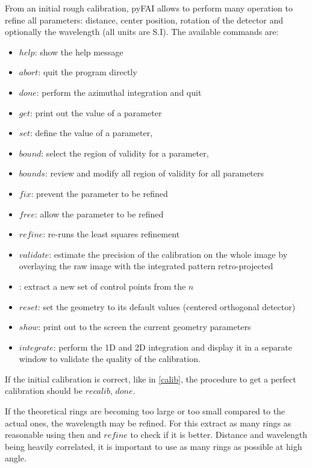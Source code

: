 \documentclass[preprint]{iucr}
\begin{document}
From an initial rough calibration, pyFAI allows to perform many operation to
refine all parameters: distance, center position, rotation of the detector and
optionally the wavelength (all units are S.I). 
The available commands are:
\begin{itemize}
\item $help$: show the help message
\item $abort$: quit the program directly
\item $done$: perform the azimuthal integration and quit
\item $get$: print out the value of a parameter 
\item $set$: define the value of a parameter,  
\item $bound$: select the region of validity for a parameter, 
\item $bounds$: review and modify all region of validity for all parameters
\item $fix$: prevent the parameter to be refined 
\item $free$: allow the parameter to be refined 
\item $refine$: re-runs the least squares refinement
\item $validate$: estimate the precision of the calibration on the whole
image by overlaying the raw image with the integrated pattern retro-projected
\item {}: extract a new set of control points from the $n$
\item $reset$: set the geometry to its default values (centered orthogonal detector)
\item $show$: print out to the screen the current geometry parameters
\item $integrate$: perform the 1D and 2D integration and display it in a
separate window to validate the quality of the calibration.
\end{itemize}

If the initial calibration is correct, like in \ref{calib}, the procedure
to get a perfect calibration should be $recalib$, $done$.

If the theoretical rings are becoming too large or too small compared to the
actual ones, the wavelength may be refined. For this extract as many rings as
reasonable using  then  and $refine$
to check if it is better. Distance and wavelength being heavily correlated, it is important
to use as many rings as possible at high angle.
\end{document}
